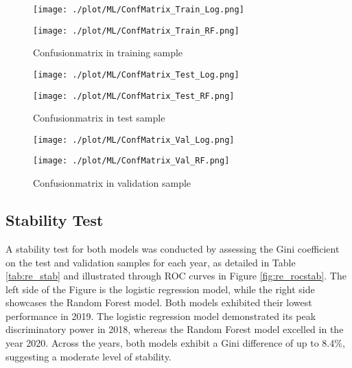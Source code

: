 \begin{figure}[H]
\begin{minipage}{.5\textwidth}
	\centering
	\texttt{[image: ./plot/ML/ConfMatrix\_Train\_Log.png]}
\end{minipage}%
\begin{minipage}{.5\textwidth}
	\centering
	\texttt{[image: ./plot/ML/ConfMatrix\_Train\_RF.png]}
\end{minipage}
    \caption{Confusionmatrix in training sample}
    \label{fig:re_confmatr1}
\end{figure}
\begin{figure}[H]
\begin{minipage}{.5\textwidth}
	\centering
	\texttt{[image: ./plot/ML/ConfMatrix\_Test\_Log.png]}
\end{minipage}%
\begin{minipage}{.5\textwidth}
	\centering
	\texttt{[image: ./plot/ML/ConfMatrix\_Test\_RF.png]}
\end{minipage}
    \caption{Confusionmatrix in test sample}
\end{figure}
\begin{figure}[H]
\begin{minipage}{.5\textwidth}
	\centering
	\texttt{[image: ./plot/ML/ConfMatrix\_Val\_Log.png]}
\end{minipage}%
\begin{minipage}{.5\textwidth}
	\centering
	\texttt{[image: ./plot/ML/ConfMatrix\_Val\_RF.png]}
\end{minipage}
    \caption{Confusionmatrix in validation sample}
    \label{fig:re_confmatr3}
\end{figure}

\subsection{Stability Test}
A stability test for both models was conducted by assessing the Gini coefficient on the test and validation samples for each year, as detailed in Table \ref{tab:re_stab} and illustrated through ROC curves in Figure \ref{fig:re_rocstab}. The left side of the Figure is the logistic regression model, while the right side showcases the Random Forest model. Both models exhibited their lowest performance in 2019. The logistic regression model demonstrated its peak discriminatory power in 2018, whereas the Random Forest model excelled in the year 2020. Across the years, both models exhibit a Gini difference of up to 8.4\%, suggesting a moderate level of stability.

